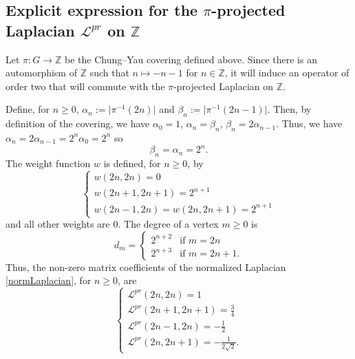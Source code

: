 \documentclass[11pt]{amsart}
\newcommand{\Z}{\mathbb{Z}}
\theoremstyle{definition}
\theoremstyle{remark}
\theoremstyle{plain}
\numberwithin{equation}{section}
\numberwithin{lemma}{section}
\numberwithin{definition}{section}
\numberwithin{proposition}{section}
\numberwithin{corollary}{section}
\numberwithin{theorem}{section}
\numberwithin{remark}{section}
\begin{document}
\subsection{Explicit expression for the $\pi$-projected Laplacian $\mathcal{L}^{pr}$ on $\Z$}

Let $\pi:G\to \Z$ be the Chung--Yau covering defined above.
Since there is an automorphism of $\Z$ such that $n\mapsto-n-1$ for $n\in\Z$, it will induce an operator of order two that will commute with the $\pi$-projected Laplacian on $\Z$.

Define, for $n\geq0$, $\alpha_n:=\vert \pi^{-1}(2n)\vert$ and $\beta_n:=\vert \pi^{-1}(2n-1)\vert$. Then, by definition of the covering, we have
$\alpha_0=1$, $\alpha_n=\beta_n$, $\beta_{n}=2\alpha_{n-1}$. 
Thus, we have $\alpha_{n}=2\alpha_{n-1}=2^{n}\alpha_0=2^{n}$ so
$$
\beta_n=\alpha_{n}=2^{n}.
$$
The weight function $w$ is defined, for $n\geq0$, by
\begin{equation}\label{w_L^pr}
\begin{cases}{ }
 w(2n,2n)=0 \\
 w(2n+1,2n+1)=2^{n+1} \\ 
 w(2n-1,2n)=w(2n,2n+1)=2^{n+1} 
\end{cases}
\end{equation}
and all other weights are 0.
The degree of a vertex $m\geq0$ is
$$ d_m=
\begin{cases}
 2^{n+2} & \text{if } m =2n \\
 2^{n+3} & \text{if } m=2n+1.
\end{cases}
$$
Thus, the non-zero matrix coefficients of the normalized Laplacian \eqref{normLaplacian}, for $n\geq0$, are 
\begin{equation}\label{Lpr}
\begin{cases}
 \mathcal{L}^{pr}(2n,2n)=1 \\
 \mathcal{L}^{pr}(2n+1,2n+1)=\frac{3}{4} \\
 \mathcal{L}^{pr}(2n-1,2n)=-\frac{1}{2} \\
 \mathcal{L}^{pr}(2n,2n+1)=-\frac{1}{2\sqrt{2}}.
\end{cases}
\end{equation}
\end{document}
